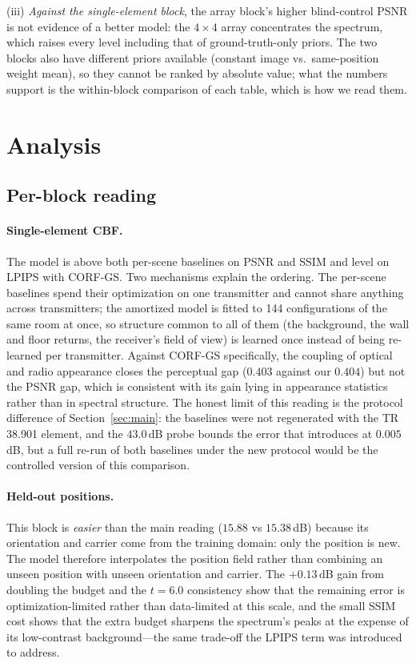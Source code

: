 \documentclass[conference]{IEEEtran}
\begin{document}
(iii) \emph{Against the single-element block}, the array block's higher
blind-control PSNR is not evidence of a better model: the $4\times4$ array
concentrates the spectrum, which raises every level including that of
ground-truth-only priors. The two blocks also have different priors available
(constant image vs.\ same-position weight mean), so they cannot be ranked by
absolute value; what the numbers support is the within-block comparison of each
table, which is how we read them.

\section{Analysis}
\label{sec:analysis}

\subsection{Per-block reading}

\paragraph{Single-element CBF.} The model is above both per-scene baselines on
PSNR and SSIM and level on LPIPS with CORF-GS. Two mechanisms explain the
ordering. The per-scene baselines spend their optimization on one transmitter
and cannot share anything across transmitters; the amortized model is fitted to
144 configurations of the same room at once, so structure common to all of them
(the background, the wall and floor returns, the receiver's field of view) is
learned once instead of being re-learned per transmitter. Against CORF-GS
specifically, the coupling of optical and radio appearance closes the perceptual
gap ($0.403$ against our $0.404$) but not the PSNR gap, which is consistent with
its gain lying in appearance statistics rather than in spectral structure. The
honest limit of this reading is the protocol difference of
Section~\ref{sec:main}: the baselines were not regenerated with the TR\,38.901
element, and the $43.0$\,dB probe bounds the error that introduces at
$0.005$\,dB, but a full re-run of both baselines under the new protocol would be
the controlled version of this comparison.

\paragraph{Held-out positions.} This block is \emph{easier} than the main
reading ($15.88$ vs $15.38$\,dB) because its orientation and carrier come from
the training domain: only the position is new. The model therefore interpolates
the position field rather than combining an unseen position with unseen
orientation and carrier. The $+0.13$\,dB gain from doubling the budget and the
$t=6.0$ consistency show that the remaining error is optimization-limited rather
than data-limited at this scale, and the small SSIM cost shows that the extra
budget sharpens the spectrum's peaks at the expense of its low-contrast
background---the same trade-off the LPIPS term was introduced to address.
\end{document}
